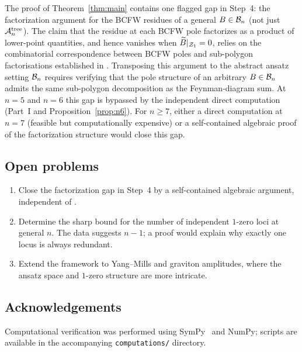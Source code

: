 The proof of Theorem~\ref{thm:main} contains one flagged gap
in Step~4: the factorization argument for the BCFW residues
of a general $B \in \mathcal{B}_n$ (not just $\mathcal{A}_n^{\mathrm{tree}}$).
The claim that the residue at each BCFW pole factorizes as a
product of lower-point quantities, and hence vanishes when
$\widetilde{B}|_{\mathcal{Z}_1} = 0$, relies on the combinatorial
correspondence between BCFW poles and sub-polygon factorisations
established in \cite[Sec.~3]{Rodina2024}. Transposing this
argument to the abstract ansatz setting $\mathcal{B}_n$ requires
verifying that the pole structure of an arbitrary $B \in \mathcal{B}_n$
admits the same sub-polygon decomposition as the Feynman-diagram
sum. At $n = 5$ and $n = 6$ this gap is bypassed by the
independent direct computation (Part~I and
Proposition~\ref{prop:n6}). For $n \geq 7$, either a direct
computation at $n = 7$ (feasible but computationally expensive)
or a self-contained algebraic proof of the factorization
structure would close this gap.

\subsection*{Open problems}

\begin{enumerate}[label=(\roman*)]
  \item Close the factorization gap in Step~4 by a
    self-contained algebraic argument, independent of
    \cite{Rodina2024}.

  \item Determine the sharp bound for the number of
    independent $1$-zero loci at general $n$.
    The data suggests $n - 1$; a proof would explain
    why exactly one locus is always redundant.

  \item Extend the framework to Yang--Mills and graviton
    amplitudes, where the ansatz space and $1$-zero
    structure are more intricate.
\end{enumerate}

\subsection*{Acknowledgements}

Computational verification was performed using
SymPy~\cite{SymPy2017} and NumPy; scripts are available in the
accompanying \texttt{computations/} directory.

\bigskip


